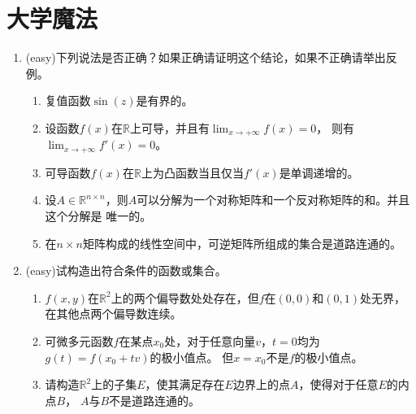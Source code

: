 \documentclass[a4paper]{article}
\begin{document}
\section{大学魔法}
\begin{enumerate}
\item (easy)下列说法是否正确？如果正确请证明这个结论，如果不正确请举出反例。
	\begin{enumerate}
	\item 复值函数$\sin(z)$是有界的。
	\item 设函数$f(x)$在$\mathbb{R}$上可导，并且有$\lim_{x\rightarrow +\infty}f(x)=0$，
	则有$\lim_{x\rightarrow +\infty}f'(x)=0$。
	\item 可导函数$f(x)$在$\mathbb{R}$上为凸函数当且仅当$f'(x)$是单调递增的。
	\item 设$A\in \mathbb{R}^{n\times n}$，则$A$可以分解为一个对称矩阵和一个反对称矩阵的和。并且这个分解是
	唯一的。
	\item 在$n\times n$矩阵构成的线性空间中，可逆矩阵所组成的集合是道路连通的。
	\end{enumerate}
\item (easy)试构造出符合条件的函数或集合。
	\begin{enumerate}
	\item $f(x,y)$在$\mathbb{R}^2$上的两个偏导数处处存在，但$f$在$(0,0)$和$(0,1)$处无界，
	在其他点两个偏导数连续。
	\item 可微多元函数$f$在某点$x_0$处，对于任意向量$v$，$t=0$均为$g(t)=f(x_0+tv)$的极小值点。
	但$x=x_0$不是$f$的极小值点。
	\item 请构造$\mathbb{R}^2$上的子集$E$，使其满足存在$E$边界上的点$A$，使得对于任意$E$的内点$B$，
	$A$与$B$不是道路连通的。
	\end{enumerate}


\end{enumerate}
\end{document}
